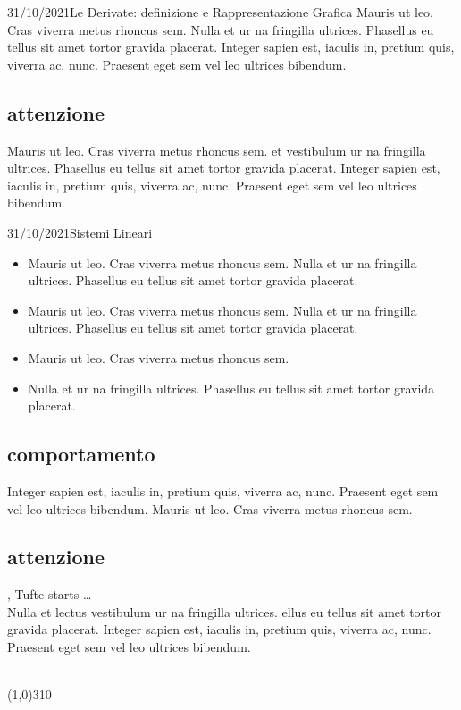 \documentclass[10pt, twoside, notitlepage, notoc, justified]{tufte-handout}
\begin{document}
\begin{loggentry}{31/10/2021}{Le Derivate: definizione e Rappresentazione Grafica}
Mauris ut leo. Cras viverra metus rhoncus sem. 
Nulla et ur na fringilla ultrices. Phasellus eu tellus sit amet tortor gravida placerat. Integer sapien est, iaculis in, pretium quis, viverra ac, nunc. Praesent eget sem vel leo ultrices bibendum.\\
\subsection{attenzione} 
Mauris ut leo. Cras viverra metus rhoncus sem.  et vestibulum ur na fringilla ultrices. Phasellus eu tellus sit amet tortor gravida placerat. Integer sapien est, iaculis in, pretium quis, viverra ac, nunc. Praesent eget sem vel leo ultrices bibendum.\\
\end{loggentry}

\begin{loggentry}{31/10/2021}{Sistemi Lineari}
\begin{itemize}
	\item Mauris ut leo. Cras viverra metus rhoncus sem. Nulla et  ur na fringilla ultrices. Phasellus eu tellus sit amet tortor gravida placerat. 
	\item Mauris ut leo. Cras viverra metus rhoncus sem. Nulla et  ur na fringilla ultrices. Phasellus eu tellus sit amet tortor gravida placerat. 
	\item Mauris ut leo. Cras viverra metus rhoncus sem.
	\item Nulla et  ur na fringilla ultrices. Phasellus eu tellus sit amet tortor gravida placerat. 
\end{itemize}

\subsection{comportamento}
Integer sapien est, iaculis in, pretium quis, viverra ac, nunc. Praesent eget sem vel leo ultrices bibendum. Mauris ut leo. Cras viverra metus rhoncus sem. 

\subsection{attenzione}
, Tufte starts \dots\\Nulla et lectus vestibulum ur na fringilla ultrices. ellus eu tellus sit amet tortor gravida placerat. Integer sapien est, iaculis in, pretium quis, viverra ac, nunc. Praesent eget sem vel leo ultrices bibendum.
\end{loggentry}
\vspace{6pt}\\
\line(1,0){310}\\
\end{document}
